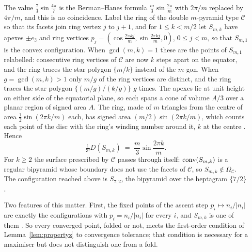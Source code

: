 The value $\tfrac{7}{3}\sin\tfrac{4\pi}{7}$ is the Berman--Hanes formula
$\tfrac{m}{3}\sin\tfrac{2\pi}{m}$ with $2\pi/m$ replaced by $4\pi/m$, and this
is no coincidence. Label the ring of the double $m$-pyramid type
$\mathcal{C}$ so that its facets join ring vertex $j$ to $j+1$, and for
$1 \leq k < m/2$ let $S_{m,k}$ have apexes $\pm e_{3}$ and ring vertices
$p_{j} = (\cos\tfrac{2\pi kj}{m}, \sin\tfrac{2\pi kj}{m}, 0)$, $0 \leq j < m$,
so that $S_{m,1}$ is the convex configuration. When $\gcd(m,k) = 1$ these are
the points of $S_{m,1}$ relabelled: consecutive ring vertices of $\mathcal{C}$
are now $k$ steps apart on the equator, and the ring traces the star polygon
$\{m/k\}$ instead of the $m$-gon. When $g = \gcd(m,k) > 1$ only $m/g$ of the
ring vertices are distinct, and the ring traces the star polygon
$\{(m/g)/(k/g)\}$ $g$ times. The apexes lie at unit height on either side of
the equatorial plane, so each spans a cone of volume $A/3$ over a planar
region of signed area $A$. The ring, made of $m$ triangles from the centre of
area $\tfrac{1}{2}\sin(2\pi k/m)$ each, has signed area
$(m/2)\sin(2\pi k/m)$, which counts each point of the disc with the ring's
winding number around it, $k$ at the centre . Hence
\begin{equation}
  \label{eq:starbipyramid}
  \tfrac{1}{3!}D(S_{m,k}) \;=\; \frac{m}{3}\sin\frac{2\pi k}{m}.
\end{equation}
For $k \geq 2$ the surface prescribed by $\mathcal{C}$ passes through itself:
$\operatorname{conv}(S_{m,k})$ is a regular bipyramid whose boundary does not use the facets
of $\mathcal{C}$, so $S_{m,k} \notin \Omega_{\mathcal{C}}$. The configuration
reached above is $S_{7,2}$, the bipyramid over the heptagram $\{7/2\}$.

Two features of this matter. First, the fixed points of the ascent step
$p_{i} \mapsto n_{i}/|n_{i}|$ are exactly the configurations with
$p_{i} = n_{i}/|n_{i}|$ for every $i$, and $S_{m,k}$ is one of them
. So every converged point, folded or not, meets the
first-order condition of Lemma~\ref{lem:propertyz} to convergence tolerance;
that condition is necessary for a maximiser but does not distinguish one from
a fold.

